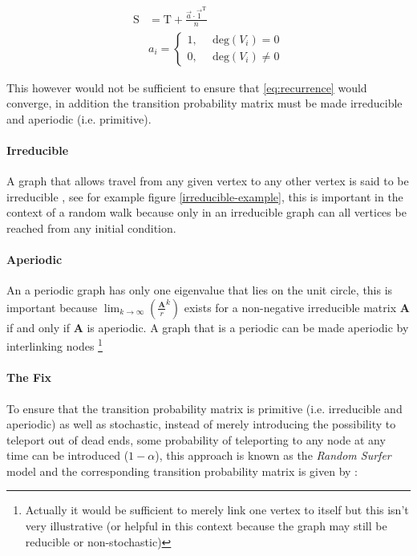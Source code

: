 \documentclass[11pt]{report}
\begin{document}
\begin{align}
\mathrm{S} &= \mathrm{T}+ \frac{\vec{a} \cdot \vec{1}^{\mathrm{T}} }{n} \label{eq:nearly-random-surfer} \\
& a_{i} = \begin{cases}
    1      , &\enspace \mathrm{deg}\left( V_{i}\right) = 0  \\
    0      , &\enspace \mathrm{deg}\left( V_{i}\right) \neq 0
\end{cases}
\end{align}

This however would not be sufficient to ensure that \eqref{eq:recurrence} would converge, in addition the transition probability matrix must be made irreducible and aperiodic (i.e. primitive). \cite{langvilleGooglePageRankScience2012}


\paragraph{Irreducible}
\label{sec:org578c303}
A graph that allows travel from any given vertex to any other vertex is said to be irreducible \cite{langvilleGooglePageRankScience2012}, see for example figure \ref{irreducible-example}, this is important in the context of a random walk because only in an irreducible graph can all vertices be reached from any initial condition.


\paragraph{Aperiodic}
\label{sec:org2c6170b}
An a periodic graph has only one eigenvalue that lies on the unit circle, this is important because \(\lim_{k\rightarrow \infty} \left( \frac{\mathbf{A}}{r}^{k} \right)\) exists for a non-negative irreducible matrix \(\mathbf{A}\) if and only if \(\mathbf{A}\) is aperiodic. A graph that is a periodic can be made aperiodic by interlinking nodes \footnote{Actually it would be sufficient to merely link one vertex to itself \cite[]{langvilleGooglePageRankScience2012} but this isn't very illustrative (or helpful in this context because the graph may still be reducible or non-stochastic)}


\paragraph{The Fix}
\label{fix}
To ensure that the transition probability matrix is primitive (i.e. irreducible and aperiodic) as well as stochastic, instead of merely introducing the possibility to teleport out of dead ends, some probability of teleporting to any node at any time can be introduced (\(1- \alpha\)), this approach is known as the \emph{Random Surfer} model and the corresponding transition probability matrix is given by \cite{larrypageAnatomyLargescaleHypertextual1998} :
\end{document}
